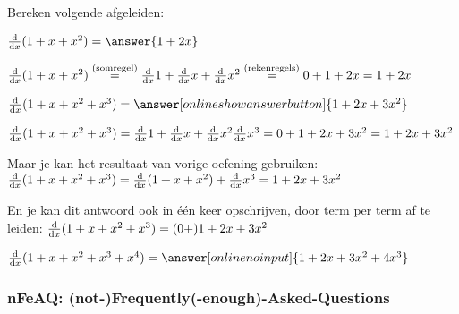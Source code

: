 \documentclass{ximera}
\begin{document}
\begin{example} Bereken volgende afgeleiden:

	\begin{question}$\ddx(1+x+x^2) = \answer{1+2x}$ 
		\begin{oplossing}[toon] 
                $\frac{\mathrm{d}}{\mathrm{d}x}(1+x+x^2) \overset{\text{(somregel)}}{=} 
                \frac{\mathrm{d}}{\mathrm{d}x} 1+ \frac{\mathrm{d}}{\mathrm{d}x} x+ \frac{\mathrm{d}}{\mathrm{d}x} x^2 \overset{\mathrm{(rekenregels)}}{=} 
                0 + 1 + 2x = 1+ 2x$
        \end{oplossing}
	\end{question}

	\begin{question} $\ddx(1+x+x^2+x^3) = \answer[onlineshowanswerbutton]{1+2x+3x^2}$ 
		\begin{oplossing} 
           $\frac{\mathrm{d}}{\mathrm{d}x}(1+x+x^2 +x^3) = \frac{\mathrm{d}}{\mathrm{d}x} 1+ \frac{\mathrm{d}}{\mathrm{d}x} x+ \frac{\mathrm{d}}{\mathrm{d}x} x^2 \frac{\mathrm{d}}{\mathrm{d}x} x^3 
                               = 0 + 1 + 2x + 3x^2 = 1+ 2x + 3x^2$
			
			Maar je kan het resultaat van vorige oefening gebruiken: 
                $\frac{\mathrm{d}}{\mathrm{d}x}(1+x+x^2 +x^3) = \frac{\mathrm{d}}{\mathrm{d}x}(1+x+x^2) +\frac{\mathrm{d}}{\mathrm{d}x} x^3 =  1+ 2x + 3x^2$
			
			En je kan dit antwoord ook in één keer opschrijven, door term per term af te leiden:
			$\frac{\mathrm{d}}{\mathrm{d}x}(1+x+x^2 +x^3) = (0 +) 1+2x+3x^2$
		\end{oplossing}	
	\end{question}
    
	\begin{question}$\ddx(1+x+x^2+x^3+x^4) = \answer[onlinenoinput]{1+2x+3x^2+4x^3}$ 
    \end{question}
    
\end{example}



\subsubsection{nFeAQ:  (not-)Frequently(-enough)-Asked-Questions}
\end{document}
